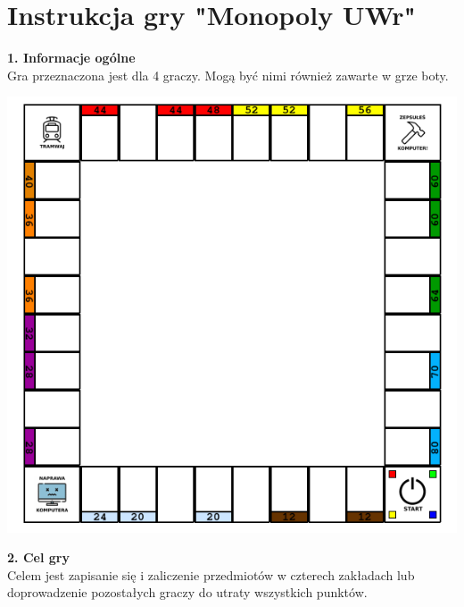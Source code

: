 \documentclass[a4paper]{article}
\author{}
\title{}
\date{\today}
\begin{document}
\section*{Instrukcja gry "Monopoly UWr"}

\noindent \textbf{1. Informacje ogólne}\\
\noindent Gra przeznaczona jest dla 4 graczy. Mogą być nimi również zawarte w grze boty.
\vspace{10pt}

\includegraphics[scale=0.8]{board.png}

\noindent \textbf{2. Cel gry}\\
\noindent Celem jest zapisanie się i zaliczenie przedmiotów w czterech zakładach lub doprowadzenie pozostałych graczy do utraty wszystkich punktów.
\vspace{10pt}
\end{document}
